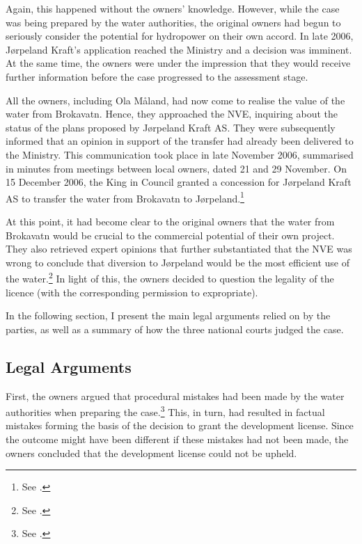Again, this happened without the owners' knowledge. However, while the case was being prepared by the water authorities, the original owners had begun to seriously consider the potential for hydropower on their own accord. In late 2006, Jørpeland Kraft's application reached the Ministry and a decision was imminent. At the same time, the owners were under the impression that they would receive further information before the case progressed to the assessment stage.

All the owners, including Ola Måland, had now come to realise the value of the water from Brokavatn. Hence, they approached the NVE, inquiring about the status of the plans proposed by Jørpeland Kraft AS. They were subsequently informed that an opinion in support of the transfer had already been delivered to the Ministry. This communication took place in late November 2006, summarised in minutes from meetings between local owners, dated 21 and 29 November. On 15 December 2006, the King in Council granted a concession for Jørpeland Kraft AS to transfer the water from Brokavatn to Jørpeland.\footnote{See \cite[3]{jorpeland09}.}

At this point, it had become clear to the original owners that the water from Brokavatn would be crucial to the commercial potential of their own project. They also retrieved expert opinions that further substantiated that the NVE was wrong to conclude that diversion to Jørpeland would be the most efficient use of the water.\footnote{See \cite[23]{jorpeland09}.} In light of this, the owners decided to question the legality of the licence (with the corresponding permission to expropriate).

In the following section, I present the main legal arguments relied on by the parties, as well as a summary of how the three national courts judged the case.

\subsection{Legal Arguments}\label{sec:5:6:2}

First, the owners argued that procedural mistakes had been made by the water authorities when preparing the case.\footnote{See \cite[12]{jorpeland09}.} This, in turn, had resulted in factual mistakes forming the basis of the decision to grant the development license. Since the outcome might have been different if these mistakes had not been made, the owners concluded that the development license could not be upheld.


